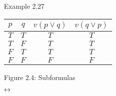 \documentclass[style=simple,size=12pt]{powerdot}
\begin{document}
\begin{wideslide}[bm=,toc=]{Example 2.27}
\begin{center}
\begin{tabular}{|c|c||c|c|}
\hline
$p$ & $q$ & $v(p \vee q)$ & $v(q \vee p)$ \\ \hline \hline
$T$ & $T$ & $T$ & $T$ \\ \hline
$T$ & $F$ & $T$ & $T$ \\ \hline
$F$ & $T$ & $T$ & $T$ \\ \hline
$F$ & $F$ & $F$ & $F$ \\ \hline
\end{tabular}
\end{center}
\end{wideslide}

\begin{wideslide}[bm=,toc=]{Figure 2.4: Subformulas}
\vspace*{-2ex}
\begin{center}
\setlength{\GapWidth}{8mm}
\setlength{\GapDepth}{8mm}
\begin{bundle}{$\mathbin{\leftrightarrow}$}
\end{bundle}
\end{center}


\end{wideslide}
\end{document}
